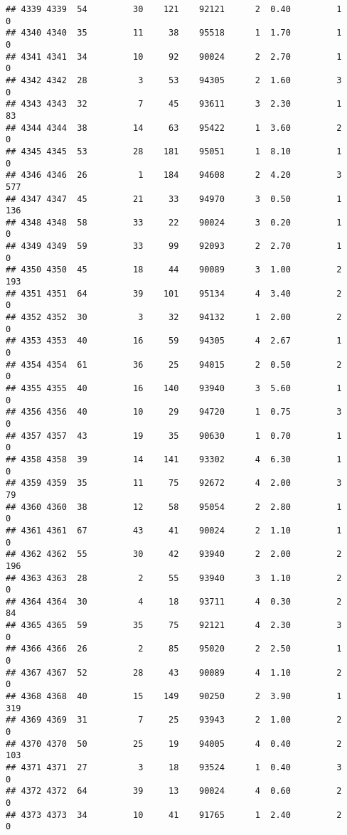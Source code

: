 \documentclass[
]{article}
\begin{document}
\begin{verbatim}
## 4339 4339  54         30    121    92121      2  0.40         1        0
## 4340 4340  35         11     38    95518      1  1.70         1        0
## 4341 4341  34         10     92    90024      2  2.70         1        0
## 4342 4342  28          3     53    94305      2  1.60         3        0
## 4343 4343  32          7     45    93611      3  2.30         1       83
## 4344 4344  38         14     63    95422      1  3.60         2        0
## 4345 4345  53         28    181    95051      1  8.10         1        0
## 4346 4346  26          1    184    94608      2  4.20         3      577
## 4347 4347  45         21     33    94970      3  0.50         1      136
## 4348 4348  58         33     22    90024      3  0.20         1        0
## 4349 4349  59         33     99    92093      2  2.70         1        0
## 4350 4350  45         18     44    90089      3  1.00         2      193
## 4351 4351  64         39    101    95134      4  3.40         2        0
## 4352 4352  30          3     32    94132      1  2.00         2        0
## 4353 4353  40         16     59    94305      4  2.67         1        0
## 4354 4354  61         36     25    94015      2  0.50         2        0
## 4355 4355  40         16    140    93940      3  5.60         1        0
## 4356 4356  40         10     29    94720      1  0.75         3        0
## 4357 4357  43         19     35    90630      1  0.70         1        0
## 4358 4358  39         14    141    93302      4  6.30         1        0
## 4359 4359  35         11     75    92672      4  2.00         3       79
## 4360 4360  38         12     58    95054      2  2.80         1        0
## 4361 4361  67         43     41    90024      2  1.10         1        0
## 4362 4362  55         30     42    93940      2  2.00         2      196
## 4363 4363  28          2     55    93940      3  1.10         2        0
## 4364 4364  30          4     18    93711      4  0.30         2       84
## 4365 4365  59         35     75    92121      4  2.30         3        0
## 4366 4366  26          2     85    95020      2  2.50         1        0
## 4367 4367  52         28     43    90089      4  1.10         2        0
## 4368 4368  40         15    149    90250      2  3.90         1      319
## 4369 4369  31          7     25    93943      2  1.00         2        0
## 4370 4370  50         25     19    94005      4  0.40         2      103
## 4371 4371  27          3     18    93524      1  0.40         3        0
## 4372 4372  64         39     13    90024      4  0.60         2        0
## 4373 4373  34         10     41    91765      1  2.40         2        0

\end{verbatim}
\end{document}
